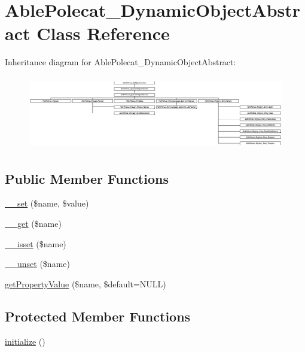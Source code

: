 \hypertarget{class_able_polecat___dynamic_object_abstract}{}\section{Able\+Polecat\+\_\+\+Dynamic\+Object\+Abstract Class Reference}
\label{class_able_polecat___dynamic_object_abstract}
Inheritance diagram for Able\+Polecat\+\_\+\+Dynamic\+Object\+Abstract\+:\begin{figure}[H]
\begin{center}
\leavevmode
\includegraphics[height=3.218391cm]{class_able_polecat___dynamic_object_abstract}
\end{center}
\end{figure}
\subsection*{Public Member Functions}
\begin{DoxyCompactItemize}
\item 
\hyperlink{class_able_polecat___dynamic_object_abstract_a83c2703c91959192f759992ad5640b67}{\+\_\+\+\_\+set} (\$name, \$value)
\item 
\hyperlink{class_able_polecat___dynamic_object_abstract_abc8e9e31bb15c8a44c3210ec551407c8}{\+\_\+\+\_\+get} (\$name)
\item 
\hyperlink{class_able_polecat___dynamic_object_abstract_a8f132f051b7cd7d570ccb9f6e2bb4201}{\+\_\+\+\_\+isset} (\$name)
\item 
\hyperlink{class_able_polecat___dynamic_object_abstract_a8a93654c7bfe3f0a9bb7af531e513d44}{\+\_\+\+\_\+unset} (\$name)
\item 
\hyperlink{class_able_polecat___dynamic_object_abstract_ae19bae5fa6db97601313c55ad17508e9}{get\+Property\+Value} (\$name, \$default=N\+U\+L\+L)
\end{DoxyCompactItemize}
\subsection*{Protected Member Functions}
\begin{DoxyCompactItemize}
\item 
\hyperlink{class_able_polecat___dynamic_object_abstract_a91098fa7d1917ce4833f284bbef12627}{initialize} ()
\end{DoxyCompactItemize}
